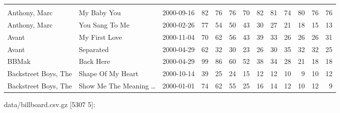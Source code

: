\documentclass[]{article}
\newenvironment{Shaded}{\begin{snugshade}}{\end{snugshade}}
\newcommand{\StringTok}[1]{\textcolor[rgb]{0.31,0.60,0.02}{#1}}
\newcommand{\VariableTok}[1]{\textcolor[rgb]{0.00,0.00,0.00}{#1}}
\newcommand{\AttributeTok}[1]{\textcolor[rgb]{0.77,0.63,0.00}{#1}}
\newcommand{\NormalTok}[1]{#1}
\begin{document}
\begin{longtable}[]{@{}lllrrrrrrrrrr@{}}
&\tabularnewline
Anthony, Marc & My Baby You & 2000-09-16 & 82 & 76 & 76 & 70 & 82 & 81 &
74 & 80 & 76 & 76\tabularnewline
Anthony, Marc & You Sang To Me & 2000-02-26 & 77 & 54 & 50 & 43 & 30 &
27 & 21 & 18 & 15 & 13\tabularnewline
Avant & My First Love & 2000-11-04 & 70 & 62 & 56 & 43 & 39 & 33 & 26 &
26 & 26 & 31\tabularnewline
Avant & Separated & 2000-04-29 & 62 & 32 & 30 & 23 & 26 & 30 & 35 & 32 &
32 & 25\tabularnewline
BBMak & Back Here & 2000-04-29 & 99 & 86 & 60 & 52 & 38 & 34 & 28 & 21 &
18 & 18\tabularnewline
Backstreet Boys, The & Shape Of My Heart & 2000-10-14 & 39 & 25 & 24 &
15 & 12 & 12 & 10 & 9 & 10 & 12\tabularnewline
Backstreet Boys, The & Show Me The Meaning \ldots{} & 2000-01-01 & 74 &
62 & 55 & 25 & 16 & 14 & 12 & 10 & 12 & 9\tabularnewline
\bottomrule
\end{longtable}

\begin{Shaded}
\end{Shaded}

data/billboard.csv.gz {[}5307 5{]}:
\end{document}
